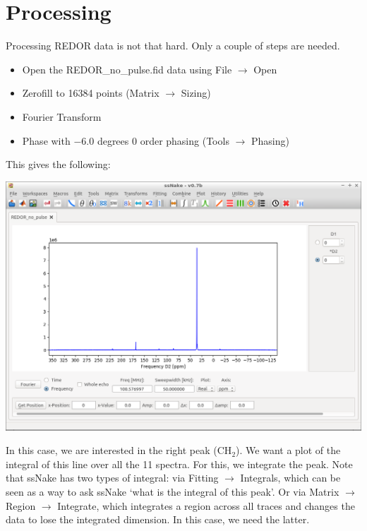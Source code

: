 \documentclass[11pt,a4paper]{article}
\begin{document}
\section{Processing}
Processing REDOR data is not that hard. Only a couple of steps are needed.

\begin{itemize}
	\item Open the REDOR\_no\_pulse.fid data using File $\longrightarrow$ Open
	\item Zerofill to 16384 points (Matrix  $\longrightarrow$ Sizing)
	\item Fourier Transform
	\item Phase with $-6.0$ degrees 0 order phasing (Tools $\longrightarrow$ Phasing)
\end{itemize}
This gives the following:
\begin{center}
\includegraphics[width=0.8\linewidth]{Figs/Fig1.png}
\end{center}
In this case, we are interested in the right peak (CH$_2$). We want a plot of the integral of this
line over all the 11 spectra. For this, we integrate the peak. Note that ssNake has two types of
integral: via Fitting  $\longrightarrow$ Integrals, which can be seen as a way to ask ssNake
`what is the integral of this peak'. Or via Matrix $\longrightarrow$ Region $\longrightarrow$
Integrate, which integrates a region across all traces and changes the data to lose the integrated
dimension. In this case, we need the latter.
\end{document}

